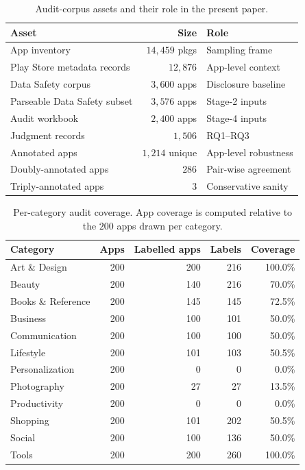 \documentclass[11pt,a4paper]{article}
\begin{document}
\begin{table}[!htbp]
\centering\small
\caption{Audit-corpus assets and their role in the present paper.}
\label{tab:eval-assets}
\begin{tabular}{lrl}
\toprule
Asset & Size & Role \\
\midrule
App inventory & $14{,}459$ pkgs & Sampling frame \\
Play Store metadata records & $12{,}876$ & App-level context \\
Data Safety corpus & $3{,}600$ apps & Disclosure baseline \\
Parseable Data Safety subset & $3{,}576$ apps & Stage-2 inputs \\
Audit workbook & $2{,}400$ apps & Stage-4 inputs \\
Judgment records & $1{,}506$ & RQ1--RQ3 \\
Annotated apps & $1{,}214$ unique & App-level robustness \\
Doubly-annotated apps & $286$ & Pair-wise agreement \\
Triply-annotated apps & $3$ & Conservative sanity \\
\bottomrule
\end{tabular}
\end{table}

\begin{table}[!htbp]
\centering\small
\caption{Per-category audit coverage. App coverage is computed
relative to the $200$ apps drawn per category.}
\label{tab:cat-cov}
\begin{tabular}{lrrrr}
\toprule
Category & Apps & Labelled apps & Labels & Coverage \\
\midrule
Art \& Design       & 200 & 200 & 216 & 100.0\% \\
Beauty              & 200 & 140 & 216 & 70.0\% \\
Books \& Reference  & 200 & 145 & 145 & 72.5\% \\
Business            & 200 & 100 & 101 & 50.0\% \\
Communication       & 200 & 100 & 100 & 50.0\% \\
Lifestyle           & 200 & 101 & 103 & 50.5\% \\
Personalization     & 200 &   0 &   0 &  0.0\% \\
Photography         & 200 &  27 &  27 & 13.5\% \\
Productivity        & 200 &   0 &   0 &  0.0\% \\
Shopping            & 200 & 101 & 202 & 50.5\% \\
Social              & 200 & 100 & 136 & 50.0\% \\
Tools               & 200 & 200 & 260 & 100.0\% \\
\bottomrule
\end{tabular}
\end{table}
\end{document}
